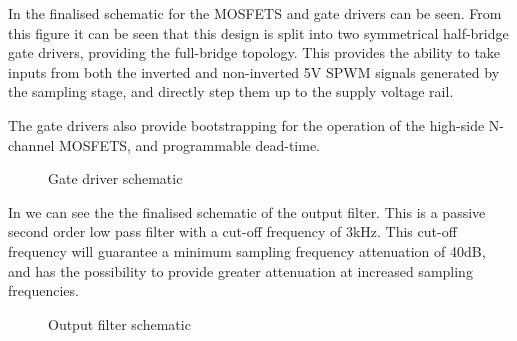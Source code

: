 \documentclass[a4paper,11pt]{article}
\begin{document}
In  the finalised schematic for the MOSFETS and gate drivers can be seen. From this figure it can be seen that this design is split into two symmetrical half-bridge gate drivers, providing the full-bridge topology. This provides the ability to take inputs from both the inverted and non-inverted 5V SPWM signals generated by the sampling stage, and directly step them up to the supply voltage rail.

The gate drivers also provide bootstrapping for the operation of the high-side N-channel MOSFETS, and programmable dead-time.

\begin{figure}[h!]
    \centering
    \caption{Gate driver schematic}
    \label{F:gate_driver}
\end{figure}

In  we can see the the finalised schematic of the output filter. This is a passive second order low pass filter with a cut-off frequency of 3kHz. This cut-off frequency will guarantee a minimum sampling frequency attenuation of 40dB, and has the possibility to provide greater attenuation at increased sampling frequencies.   

\begin{figure}[h!]
    \centering
    \caption{Output filter schematic}
    \label{F:output_filter}
\end{figure}
\end{document}
